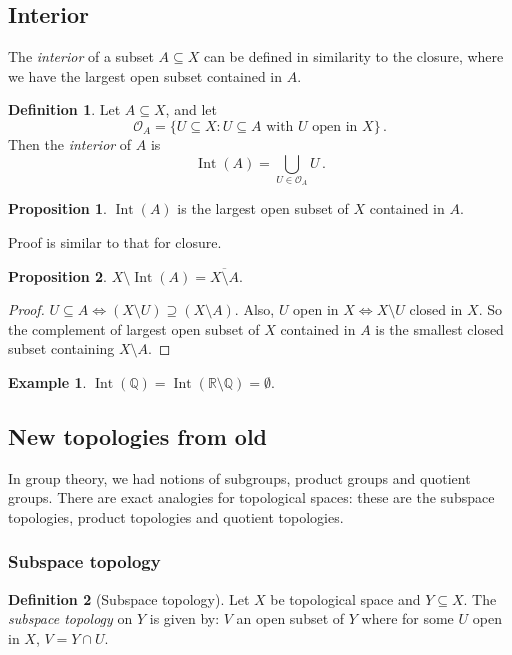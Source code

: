 \documentclass[a4paper,11pt]{article}
\theoremstyle{definition}
\newtheorem*{defn}{Definition}
\newtheorem*{prop}{Proposition}
\newtheorem*{ex}{Example}
\DeclareMathOperator{\Int}{Int}
\numberwithin{equation}{section}
\begin{document}
\subsection{Interior}
The \emph{interior} of a subset $A\subseteq X$ can be defined in similarity to the closure, where we have the largest open subset contained in $A$.

\begin{defn}
    Let $A\subseteq X$, and let
    \begin{equation}
        \mathcal{O}_A=\{U\subseteq X: U\subseteq A\text{ with }U\text{ open in }X\}\,.
    \end{equation}
    Then the \emph{interior} of $A$ is 
    \begin{equation}
        \Int(A)=\bigcup_{U\in\mathcal{O}_A}U\,.
    \end{equation}
\end{defn}

\begin{prop}
    $\Int(A)$ is the largest open subset of $X$ contained in $A$.
\end{prop}

Proof is similar to that for closure.
\begin{prop}
    $X\setminus\Int(A)=\overline{X\setminus A}$.
\end{prop}
\begin{proof}
$U\subseteq A\Leftrightarrow(X\setminus U)\supseteq(X\setminus A)$. Also, $U$ open in $X\Leftrightarrow X\setminus U$ closed in $X$. So the complement of largest open subset of $X$ contained in $A$ is the smallest closed subset containing $X\setminus A$.
\end{proof}

\begin{ex}
$\Int(\mathbb{Q})=\Int(\mathbb{R}\setminus\mathbb{Q})=\emptyset$.
\end{ex}

\subsection{New topologies from old}
In group theory, we had notions of subgroups, product groups and quotient groups. There are exact analogies for topological spaces: these are the subspace topologies, product topologies and quotient topologies.

\subsubsection{Subspace topology}
\begin{defn}[Subspace topology]
    Let $X$ be topological space and $Y\subseteq X$. The \emph{subspace topology} on $Y$ is given by: $V$ an open subset of $Y$ where for some $U$ open in $X$, $V=Y\cap U$.
\end{defn}
\end{document}
